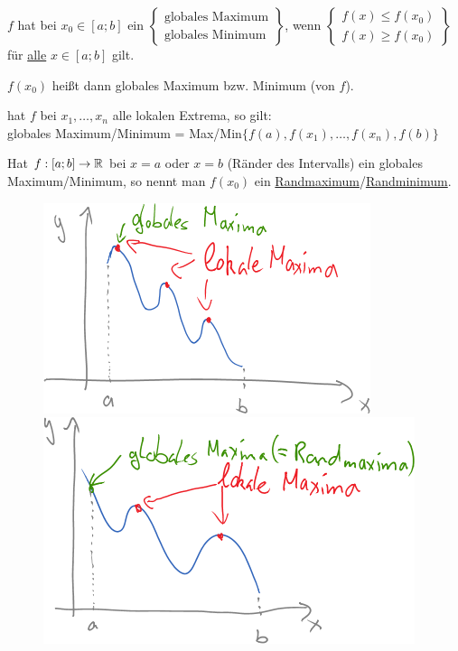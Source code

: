 $f$ hat bei $x_0\in[a;b]$ ein $\left\{\begin{array}{c}\text{globales Maximum}\\\text{globales Minimum}\end{array}\right\}$, wenn $\left\{\begin{array}{c}f(x)\le f(x_0)\\f(x)\ge f(x_0)\end{array}\right\}$ für \ul{alle} $x\in[a;b]$ gilt.

$f(x_0)$ heißt dann globales Maximum bzw. Minimum (von $f$).

\Bem hat $f$ bei $x_1,\ldots,x_n$ alle lokalen Extrema, so gilt:\\
globales Maximum/Minimum = Max/Min$\{f(a),f(x_1),\ldots,f(x_n),f(b)\}$ 

\Def Hat $f:[a;b]\to\mathbb{R}$ bei $x=a$ oder $x=b$ (Ränder des Intervalls) ein globales Maximum/Minimum, so nennt man $f(x_0)$ ein \ul{Randmaximum}/\ul{Randminimum}.

\begin{figure}[h!]
	\centering
	\begin{minipage}{0.4\linewidth}
		\centering\includegraphics[width=\linewidth]{Bilder/151}
		\caption{}
	\end{minipage}
	\qquad
	\begin{minipage}{0.4\linewidth}
		\centering\includegraphics[width=\linewidth]{Bilder/152}
		\caption{}
	\end{minipage}
\end{figure}

